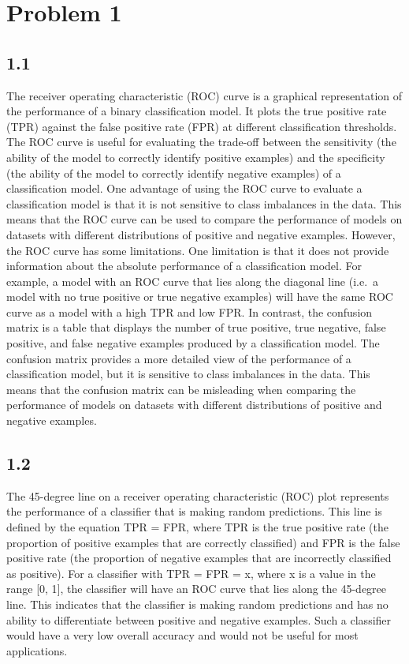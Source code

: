 \documentclass[
  11pt,
]{article}
\begin{document}
\hypertarget{problem-1}{%
\section{Problem 1}\label{problem-1}}

\hypertarget{section}{%
\subsection{1.1}\label{section}}

The receiver operating characteristic (ROC) curve is a graphical
representation of the performance of a binary classification model. It
plots the true positive rate (TPR) against the false positive rate (FPR)
at different classification thresholds. The ROC curve is useful for
evaluating the trade-off between the sensitivity (the ability of the
model to correctly identify positive examples) and the specificity (the
ability of the model to correctly identify negative examples) of a
classification model. One advantage of using the ROC curve to evaluate a
classification model is that it is not sensitive to class imbalances in
the data. This means that the ROC curve can be used to compare the
performance of models on datasets with different distributions of
positive and negative examples. However, the ROC curve has some
limitations. One limitation is that it does not provide information
about the absolute performance of a classification model. For example, a
model with an ROC curve that lies along the diagonal line (i.e.~a model
with no true positive or true negative examples) will have the same ROC
curve as a model with a high TPR and low FPR. In contrast, the confusion
matrix is a table that displays the number of true positive, true
negative, false positive, and false negative examples produced by a
classification model. The confusion matrix provides a more detailed view
of the performance of a classification model, but it is sensitive to
class imbalances in the data. This means that the confusion matrix can
be misleading when comparing the performance of models on datasets with
different distributions of positive and negative examples.

\hypertarget{section-1}{%
\subsection{1.2}\label{section-1}}

The 45-degree line on a receiver operating characteristic (ROC) plot
represents the performance of a classifier that is making random
predictions. This line is defined by the equation TPR = FPR, where TPR
is the true positive rate (the proportion of positive examples that are
correctly classified) and FPR is the false positive rate (the proportion
of negative examples that are incorrectly classified as positive). For a
classifier with TPR = FPR = x, where x is a value in the range {[}0,
1{]}, the classifier will have an ROC curve that lies along the
45-degree line. This indicates that the classifier is making random
predictions and has no ability to differentiate between positive and
negative examples. Such a classifier would have a very low overall
accuracy and would not be useful for most applications.
\end{document}
